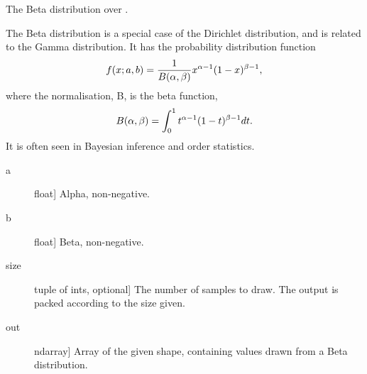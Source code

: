 \documentclass[letterpaper,10pt,english]{sphinxmanual}
\begin{document}

\begin{fulllineitems}
\label{pygeomod:pygeomod.geomodeller_xml_obj.beta}
The Beta distribution over \code{{[}0, 1{]}}.

The Beta distribution is a special case of the Dirichlet distribution,
and is related to the Gamma distribution.  It has the probability
distribution function
\begin{gather}
\begin{split}f(x; a,b) = \frac{1}{B(\alpha, \beta)} x^{\alpha - 1}
(1 - x)^{\beta - 1},\end{split}\notag
\end{gather}
where the normalisation, B, is the beta function,
\begin{gather}
\begin{split}B(\alpha, \beta) = \int_0^1 t^{\alpha - 1}
(1 - t)^{\beta - 1} dt.\end{split}\notag
\end{gather}
It is often seen in Bayesian inference and order statistics.
\begin{description}
\item[{a}] \leavevmode{[}float{]}
Alpha, non-negative.

\item[{b}] \leavevmode{[}float{]}
Beta, non-negative.

\item[{size}] \leavevmode{[}tuple of ints, optional{]}
The number of samples to draw.  The output is packed according to
the size given.

\end{description}
\begin{description}
\item[{out}] \leavevmode{[}ndarray{]}
Array of the given shape, containing values drawn from a
Beta distribution.

\end{description}

\end{fulllineitems}

\end{document}

